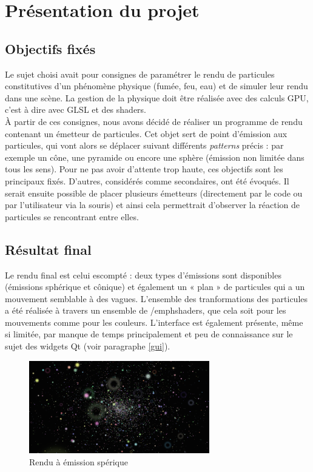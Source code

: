 \chapter{Présentation du projet}

\section{Objectifs fixés}

Le sujet choisi avait pour consignes de paramétrer le rendu de particules
constitutives d'un phénomène physique (fumée, feu, eau) et de simuler leur
rendu dans une scène. La gestion de la physique doit être réalisée avec des
calculs GPU, c'est à dire avec GLSL et des shaders.\\

À partir de ces consignes, nous avons décidé de réaliser un programme de rendu
contenant un émetteur de particules. Cet objet sert de point d'émission aux
particules, qui vont alors se déplacer suivant différents \emph{patterns} précis
: par exemple un cône, une pyramide ou encore une sphère (émission non limitée 
dans tous les sens). Pour ne pas avoir d'attente trop haute, ces objectifs sont
les principaux fixés. D'autres, considérés comme secondaires, ont été évoqués.
Il serait ensuite possible de placer plusieurs émetteurs (directement par le 
code ou par l'utilisateur via la souris) et ainsi cela permettrait d'observer la
réaction de particules se rencontrant entre elles.\\

\section{Résultat final}

Le rendu final est celui escompté : deux types d'émissions sont disponibles
(émissions sphérique et cônique) et également un « plan » de particules qui a un
mouvement semblable à des vagues. L'ensemble des tranformations des particules a
été réalisée à travers un ensemble de /emph{shaders}, que cela soit pour les
mouvements comme pour les couleurs. L'interface est également présente, même si
limitée, par manque de temps principalement et peu de connaissance sur le sujet
des widgets Qt (voir paragraphe \ref{gui}).

\begin{figure}[h]
	\begin{center}
		\includegraphics[width=0.7\textwidth]{img/21-sphere.png}
	\end{center}
	\caption{Rendu à émission spérique}
\end{figure}

